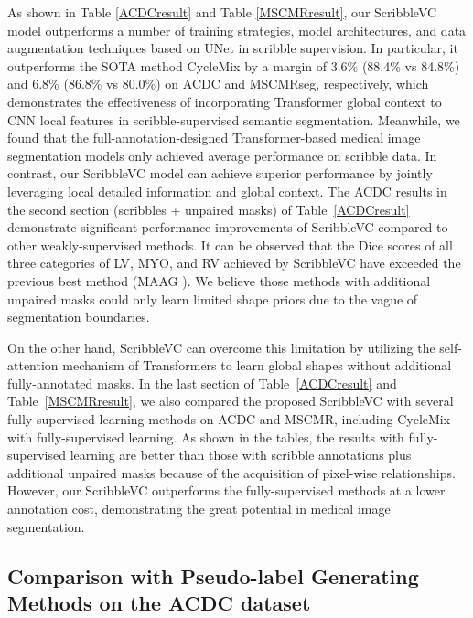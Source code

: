 \documentclass[sigconf,natbib=false]{acmart}
\begin{document}
As shown in Table \ref{ACDCresult} and Table \ref{MSCMRresult}, our ScribbleVC model outperforms a number of training strategies, model architectures, and data augmentation techniques based on UNet in scribble supervision. In particular, it outperforms the SOTA method CycleMix by a margin of 3.6\% (88.4\% vs 84.8\%) and 6.8\% (86.8\% vs 80.0\%) on ACDC and MSCMRseg, respectively, which demonstrates the effectiveness of incorporating Transformer global context to CNN local features in scribble-supervised semantic segmentation. Meanwhile, we found that the full-annotation-designed Transformer-based medical image segmentation models only achieved average performance on scribble data. In contrast, our ScribbleVC model can achieve superior performance by jointly leveraging local detailed information and global context. The ACDC results in the second section (scribbles + unpaired masks) of Table~\ref{ACDCresult} demonstrate significant performance improvements of ScribbleVC compared to other weakly-supervised methods. It can be observed that the Dice scores of all three categories of LV, MYO, and RV achieved by ScribbleVC have exceeded the previous best method (MAAG \cite{MAAG}). We believe those methods with additional unpaired masks could only learn limited shape priors due to the vague of segmentation boundaries.

On the other hand, ScribbleVC can overcome this limitation by utilizing the self-attention mechanism of Transformers to learn global shapes without additional fully-annotated masks. 
In the last section of Table~\ref{ACDCresult} and Table~\ref{MSCMRresult}, we also compared the proposed ScribbleVC with several fully-supervised learning methods on ACDC and MSCMR, including CycleMix with fully-supervised learning. As shown in the tables, the results with fully-supervised learning are better than those with scribble annotations plus additional unpaired masks because of the acquisition of pixel-wise relationships.
However, our ScribbleVC outperforms the fully-supervised methods at a lower annotation cost, demonstrating the great potential in medical image segmentation.
\vspace{-4mm}
\subsection{Comparison with Pseudo-label Generating Methods on the ACDC dataset}
\end{document}
